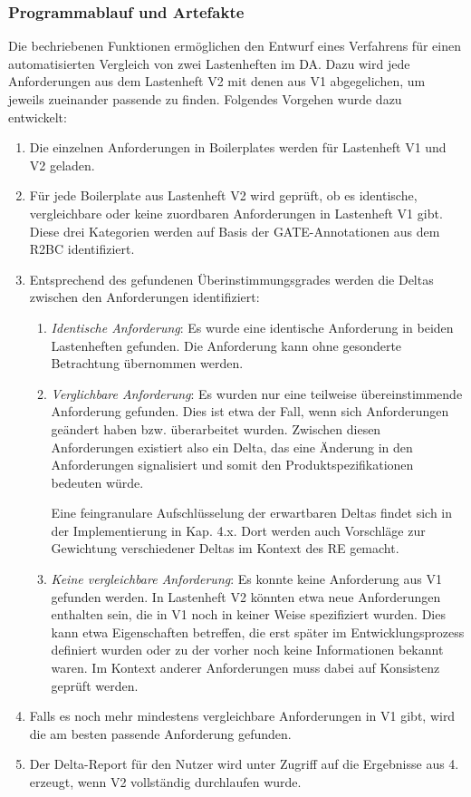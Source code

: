 \documentclass[12pt]{report}
\begin{document}
\subsubsection{Programmablauf und Artefakte}
Die bechriebenen Funktionen ermöglichen den Entwurf eines Verfahrens für einen automatisierten Vergleich von zwei Lastenheften im DA. Dazu wird jede Anforderungen aus dem Lastenheft V2 mit denen aus V1 abgegelichen, um jeweils zueinander passende zu finden.
Folgendes Vorgehen wurde dazu entwickelt:
\begin{enumerate}
\item Die einzelnen Anforderungen in Boilerplates werden für Lastenheft V1 und V2 geladen.
\item Für jede Boilerplate aus Lastenheft V2 wird geprüft, ob es identische, vergleichbare oder keine zuordbaren Anforderungen in Lastenheft V1 gibt. Diese drei Kategorien werden auf Basis der GATE-Annotationen aus dem R2BC identifiziert.
\item Entsprechend des gefundenen Überinstimmungsgrades werden die Deltas zwischen den Anforderungen identifiziert:
\begin{enumerate}
\item \textit{Identische Anforderung}: Es wurde eine identische Anforderung in beiden Lastenheften gefunden. Die Anforderung kann ohne gesonderte Betrachtung übernommen werden.

\item \textit{Verglichbare Anforderung}: Es wurden nur eine teilweise übereinstimmende Anforderung gefunden. Dies ist etwa der Fall, wenn sich Anforderungen geändert haben bzw. überarbeitet wurden. Zwischen diesen Anforderungen existiert also ein Delta, das eine Änderung in den Anforderungen signalisiert und somit den Produktspezifikationen bedeuten würde. 

Eine feingranulare Aufschlüsselung der erwartbaren Deltas findet sich in der Implementierung in Kap. 4.x. Dort werden auch Vorschläge zur Gewichtung verschiedener Deltas im Kontext des RE gemacht.

\item \textit{Keine vergleichbare Anforderung}: Es konnte keine Anforderung aus V1 gefunden werden. In Lastenheft V2 könnten etwa neue Anforderungen enthalten sein, die in V1 noch in keiner Weise spezifiziert wurden. Dies kann etwa Eigenschaften betreffen, die erst später im Entwicklungsprozess definiert wurden oder zu der vorher noch keine Informationen bekannt waren. Im Kontext anderer Anforderungen muss dabei auf Konsistenz geprüft werden.

\end{enumerate} 
\item Falls es noch mehr mindestens vergleichbare Anforderungen in V1 gibt, wird die am besten passende Anforderung gefunden. 
\item Der Delta-Report für den Nutzer wird unter Zugriff auf die Ergebnisse aus 4. erzeugt, wenn V2 vollständig durchlaufen wurde.
\end{enumerate}
\end{document}
